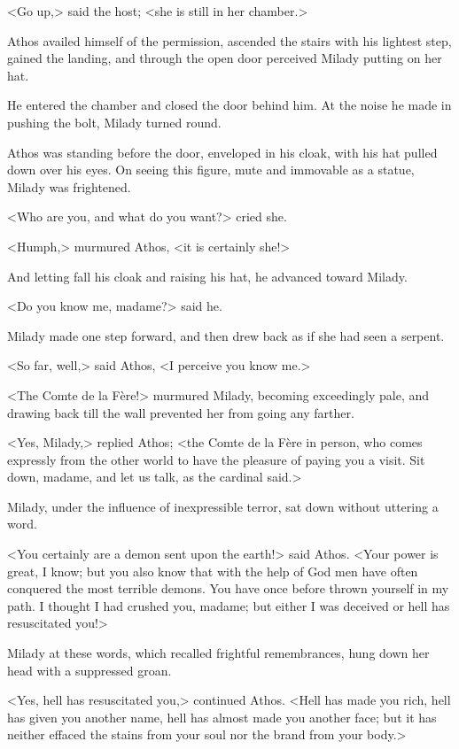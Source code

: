 <Go up,> said the host; <she is still in her chamber.> 

Athos availed himself of the permission, ascended the stairs with his lightest step, gained the landing, and through the open door perceived Milady putting on her hat. 

He entered the chamber and closed the door behind him. At the noise he made in pushing the bolt, Milady turned round. 

Athos was standing before the door, enveloped in his cloak, with his hat pulled down over his eyes. On seeing this figure, mute and immovable as a statue, Milady was frightened. 

<Who are you, and what do you want?> cried she. 

<Humph,> murmured Athos, <it is certainly she!> 

And letting fall his cloak and raising his hat, he advanced toward Milady. 

<Do you know me, madame?> said he. 

Milady made one step forward, and then drew back as if she had seen a serpent. 

<So far, well,> said Athos, <I perceive you know me.> 

<The Comte de la Fère!> murmured Milady, becoming exceedingly pale, and drawing back till the wall prevented her from going any farther. 

<Yes, Milady,> replied Athos; <the Comte de la Fère in person, who comes expressly from the other world to have the pleasure of paying you a visit. Sit down, madame, and let us talk, as the cardinal said.> 

Milady, under the influence of inexpressible terror, sat down without uttering a word. 

<You certainly are a demon sent upon the earth!> said Athos. <Your power is great, I know; but you also know that with the help of God men have often conquered the most terrible demons. You have once before thrown yourself in my path. I thought I had crushed you, madame; but either I was deceived or hell has resuscitated you!> 

Milady at these words, which recalled frightful remembrances, hung down her head with a suppressed groan. 

<Yes, hell has resuscitated you,> continued Athos. <Hell has made you rich, hell has given you another name, hell has almost made you another face; but it has neither effaced the stains from your soul nor the brand from your body.> 

